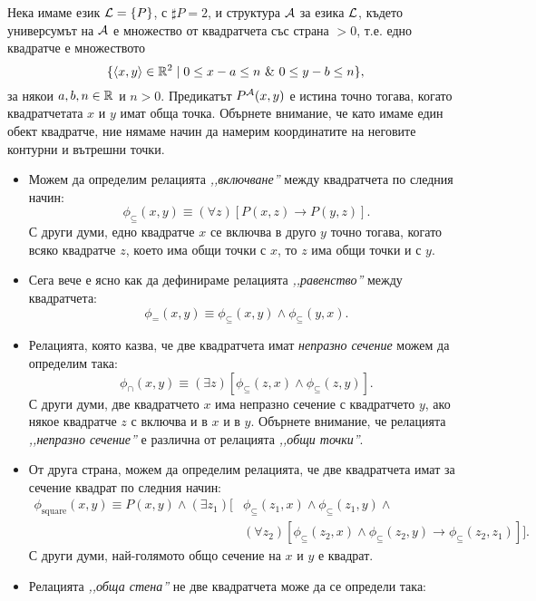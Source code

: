 \begin{example}
  Нека имаме език $\mathcal{L} = \{P\}$, с $\sharp P = 2$, и структура $\mathcal{A}$ за езика $\mathcal{L}$, където
  универсумът на $\mathcal{A}$ е множество от квадратчета със страна $> 0$, т.е.
  едно квадратче е множеството
  \[\{\langle{x,y}\rangle \in \mathbb{R}^2 \mid 0 \leq x - a \leq n\ \&\ 0 \leq y-b \leq n\},\]
  за някои $a, b, n \in \mathbb{R}$ и $n > 0$.
  Предикатът $P^{\mathcal{A}}(x,y)$ е истина точно тогава, когато квадратчетата $x$ и $y$ имат обща точка.
  Обърнете внимание, че като имаме един обект квадратче, ние нямаме начин да намерим координатите на неговите контурни и вътрешни точки.
  \begin{itemize}
  \item
    Можем да определим релацията \emph{,,включване''} между квадратчета по следния начин:
    \[\phi_{\subseteq}(x,y) \equiv (\forall z)[P(x,z) \to P(y,z)].\]
    С други думи, едно квадратче $x$ се включва в друго $y$ точно тогава, когато
    всяко квадратче $z$, което има общи точки с $x$, то $z$ има общи точки и с $y$.
  \item
    Сега вече е ясно как да дефинираме релацията \emph{,,равенство''} между квадратчета:
    \[\phi_{=}(x,y) \equiv \phi_{\subseteq}(x,y) \land \phi_{\subseteq}(y,x).\]
  \item
    Релацията, която казва, че две квадратчета имат \emph{непразно сечение} можем да определим така:
    \[\phi_{\cap}(x,y) \equiv (\exists z)[\phi_{\subseteq}(z,x) \land \phi_{\subseteq}(z,y)].\]
    С други думи, две квадратчето $x$ има непразно сечение с квадратчето $y$, ако някое
    квадратче $z$ с включва и в $x$ и в $y$.
    Обърнете внимание, че релацията \emph{,,непразно сечение''} е различна от релацията \emph{,,общи точки''}.
  \item
    От друга страна, можем да определим релацията, че две квадратчета имат за сечение квадрат по следния начин:
    \begin{align*}
      \phi_{\text{square}}(x,y) \equiv P(x,y) \land (\exists z_1)[ & \phi_{\subseteq}(z_1,x) \land \phi_{\subseteq}(z_1,y) \land \\
                                                    & (\forall z_2)[\phi_{\subseteq}(z_2,x) \land \phi_{\subseteq}(z_2,y) \to \phi_{\subseteq}(z_2,z_1)]].
    \end{align*}
    С други думи, най-голямото общо сечение на $x$ и $y$ е квадрат.
  \item
    Релацията \emph{,,обща стена''} не две квадратчета може да се определи така:
    \begin{align*}

\end{align*}
\end{itemize}
\end{example}
